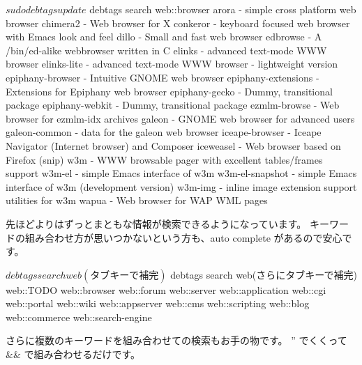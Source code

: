 \documentclass[mingoth,a4paper]{jsarticle}
\begin{document}
\begin{commandline}
$ sudo debtags update
$ debtags search web::browser
arora - simple cross platform web browser
chimera2 - Web browser for X
conkeror - keyboard focused web browser with Emacs look and feel
dillo - Small and fast web browser
edbrowse - A /bin/ed-alike webbrowser written in C
elinks - advanced text-mode WWW browser
elinks-lite - advanced text-mode WWW browser - lightweight version
epiphany-browser - Intuitive GNOME web browser
epiphany-extensions - Extensions for Epiphany web browser
epiphany-gecko - Dummy, transitional package
epiphany-webkit - Dummy, transitional package
ezmlm-browse - Web browser for ezmlm-idx archives
galeon - GNOME web browser for advanced users
galeon-common - data for the galeon web browser
iceape-browser - Iceape Navigator (Internet browser) and Composer
iceweasel - Web browser based on Firefox
(snip)
w3m - WWW browsable pager with excellent tables/frames support
w3m-el - simple Emacs interface of w3m
w3m-el-snapshot - simple Emacs interface of w3m (development version)
w3m-img - inline image extension support utilities for w3m
wapua - Web browser for WAP WML pages
\end{commandline}

先ほどよりはずっとまともな情報が検索できるようになっています。
キーワードの組み合わせ方が思いつかないという方も、auto complete があるので安心です。

\begin{commandline}
$ debtags search web(タブキーで補完)
$ debtags search web\:\:(さらにタブキーで補完)
web::TODO           web::browser        web::forum          web::server
web::application    web::cgi            web::portal         web::wiki
web::appserver      web::cms            web::scripting
web::blog           web::commerce       web::search-engine
\end{commandline}

さらに複数のキーワードを組み合わせての検索もお手の物です。
'' でくくって \&\& で組み合わせるだけです。
\end{document}
